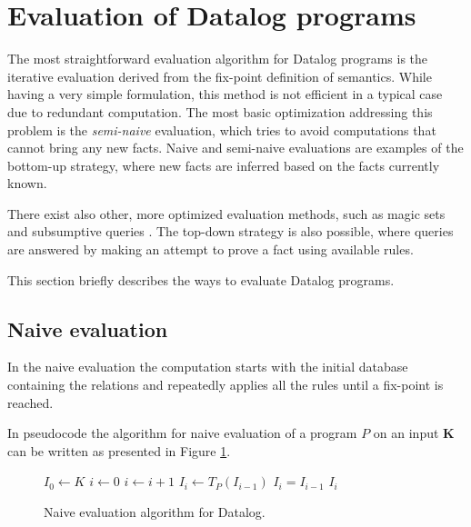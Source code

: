 \section{Evaluation of Datalog programs}
The most straightforward evaluation algorithm for Datalog programs is the iterative evaluation derived from the fix-point definition of semantics. While having a very simple formulation, this method is not efficient in a typical case due to redundant computation. The most basic optimization addressing this problem is the \emph{semi-naive} evaluation, which tries to avoid computations that cannot bring any new facts. Naive and semi-naive evaluations are examples of the bottom-up strategy, where new facts are inferred based on the facts currently known.

There exist also other, more optimized evaluation methods, such as magic sets \cite{magicsets} and subsumptive queries \cite{subsumptivequeries}. The top-down strategy \cite{fod, subsumptivequeries} is also possible, where queries are answered by making an attempt to prove a fact using available rules.

This section briefly describes the ways to evaluate Datalog programs.

\subsection{Naive evaluation}\label{ss:datalognaiveeval}
In the naive evaluation the computation starts with the initial database containing the \edb relations and repeatedly applies all the rules until a fix-point is reached.

In pseudocode the algorithm for naive evaluation of a program $P$ on an input $\textbf{K}$ can be written as presented in Figure \ref{psc:naiveevaldatalog}.

\begin{figure}[!htbp]
\begin{codebox}
  \li $I_0 \leftarrow K$
  \li $i \leftarrow 0$
  \li \Repeat
  \li $i \leftarrow i + 1$
  \li $I_i \leftarrow T_P(I_{i-1})$
  \li \Until $I_i = I_{i-1}$
  \li \Return $I_i$
\end{codebox}
\caption{Naive evaluation algorithm for Datalog.}\label{psc:naiveevaldatalog}
\end{figure}

